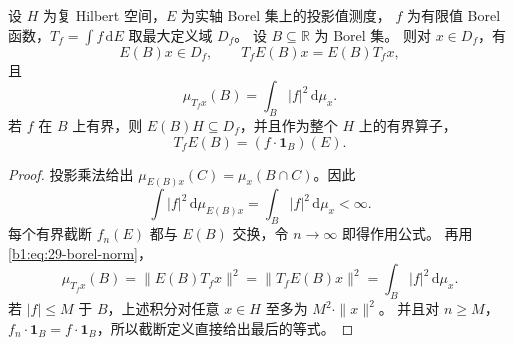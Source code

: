 \begin{proposition}[谱投影与标量谱测度的变换]
\label{b1:prop:29-unbounded-spectral-commutation}
设 \(H\) 为复 Hilbert 空间，\(E\) 为实轴 Borel 集上的投影值测度，
\(f\) 为有限值 Borel 函数，\(T_f=\int f\,\mathrm dE\) 取最大定义域 \(D_f\)。
设 \(B\subseteq\mathbb R\) 为 Borel 集。
则对 \(x\in D_f\)，有
\[
 E(B)x\in D_f,\qquad T_fE(B)x=E(B)T_fx,
\]
且
\begin{equation}\label{b1:eq:29-unbounded-scalar-transport}
 \mu_{T_fx}(B)=\int_B|f|^2\,\mathrm d\mu_x.
\end{equation}
若 \(f\) 在 \(B\) 上有界，则 \(E(B)H\subseteq D_f\)，并且作为整个 \(H\) 上的有界算子，
\[
 T_fE(B)=(f\cdot\mathbf1_B)(E).
\]
\end{proposition}
\begin{proof}
投影乘法给出
\(\mu_{E(B)x}(C)=\mu_x(B\cap C)\)。因此
\[
 \int|f|^2\,\mathrm d\mu_{E(B)x}=\int_B|f|^2\,\mathrm d\mu_x<\infty.
\]
每个有界截断 \(f_n(E)\) 都与 \(E(B)\) 交换，令 \(n\to\infty\) 即得作用公式。
再用\eqref{b1:eq:29-borel-norm}，
\[
 \mu_{T_fx}(B)=\|E(B)T_fx\|^2
 =\|T_fE(B)x\|^2=\int_B|f|^2\,\mathrm d\mu_x.
\]
若 \(|f|\le M\) 于 \(B\)，上述积分对任意 \(x\in H\) 至多为 \(M^2\cdot\|x\|^2\)。
并且对 \(n\ge M\)，\(f_n\cdot\mathbf1_B=f\cdot\mathbf1_B\)，所以截断定义直接给出最后的等式。
\end{proof}

